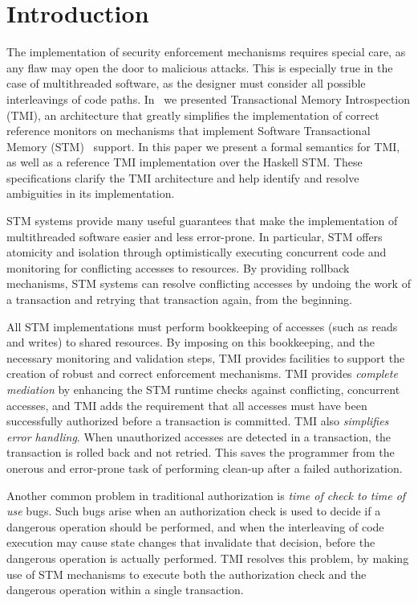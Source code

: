 \section{Introduction} %
\label{sec:introduction}

The implementation of security enforcement mechanisms requires special care,
as any flaw may open the door to malicious attacks. This is especially true
in the case of multithreaded software, as the designer must consider all possible
interleavings of code paths. In~\cite{tmi} we presented Transactional Memory Introspection
(TMI), an architecture that greatly simplifies the implementation of correct
reference monitors on 
mechanisms that
implement Software Transactional Memory (STM)~\cite{harrisFraserSTM,hm93} support.
%
In this paper we present a formal semantics for TMI,
    as well as a reference TMI implementation over the Haskell STM.
These specifications clarify the TMI architecture
    and help identify and resolve ambiguities 
    in its implementation.


STM systems provide many useful guarantees that make the implementation of multithreaded
software easier and less error-prone. In particular, STM offers 
atomicity and isolation
through optimistically executing concurrent code and monitoring
for conflicting accesses to resources.
By providing
rollback mechanisms, STM systems can resolve conflicting accesses by undoing the work of a transaction
and retrying that transaction again, from the beginning.

All STM implementations must perform bookkeeping of accesses (such as reads and writes)
to shared resources. By imposing on 
this bookkeeping, and the necessary monitoring and validation steps,
TMI provides facilities to support the creation of robust and correct
enforcement mechanisms. 
TMI provides \emph{complete mediation} by enhancing the STM
runtime checks against conflicting, concurrent accesses, and TMI
adds the requirement that all accesses must have been successfully
authorized before a transaction is committed.
TMI also \emph{simplifies error handling}. When unauthorized accesses are detected in a transaction,
the transaction is rolled back and not retried. 
This saves the programmer from the onerous and error-prone task of performing clean-up after
a failed authorization.

Another common problem in traditional authorization is {\em time of check to time of use} bugs.
Such bugs arise when an authorization check is used to decide if a
dangerous operation should be performed, and when the interleaving
of code execution may cause state changes that invalidate that
decision, before the dangerous operation is actually performed.
TMI resolves this problem, by making use of STM mechanisms to
execute both the authorization check and the dangerous operation
within a single transaction.

